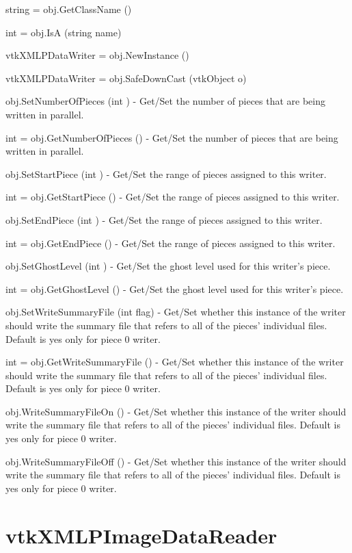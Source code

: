\begin{DoxyItemize}
\item {\ttfamily string = obj.\-Get\-Class\-Name ()}  
\item {\ttfamily int = obj.\-Is\-A (string name)}  
\item {\ttfamily vtk\-X\-M\-L\-P\-Data\-Writer = obj.\-New\-Instance ()}  
\item {\ttfamily vtk\-X\-M\-L\-P\-Data\-Writer = obj.\-Safe\-Down\-Cast (vtk\-Object o)}  
\item {\ttfamily obj.\-Set\-Number\-Of\-Pieces (int )} -\/ Get/\-Set the number of pieces that are being written in parallel.  
\item {\ttfamily int = obj.\-Get\-Number\-Of\-Pieces ()} -\/ Get/\-Set the number of pieces that are being written in parallel.  
\item {\ttfamily obj.\-Set\-Start\-Piece (int )} -\/ Get/\-Set the range of pieces assigned to this writer.  
\item {\ttfamily int = obj.\-Get\-Start\-Piece ()} -\/ Get/\-Set the range of pieces assigned to this writer.  
\item {\ttfamily obj.\-Set\-End\-Piece (int )} -\/ Get/\-Set the range of pieces assigned to this writer.  
\item {\ttfamily int = obj.\-Get\-End\-Piece ()} -\/ Get/\-Set the range of pieces assigned to this writer.  
\item {\ttfamily obj.\-Set\-Ghost\-Level (int )} -\/ Get/\-Set the ghost level used for this writer's piece.  
\item {\ttfamily int = obj.\-Get\-Ghost\-Level ()} -\/ Get/\-Set the ghost level used for this writer's piece.  
\item {\ttfamily obj.\-Set\-Write\-Summary\-File (int flag)} -\/ Get/\-Set whether this instance of the writer should write the summary file that refers to all of the pieces' individual files. Default is yes only for piece 0 writer.  
\item {\ttfamily int = obj.\-Get\-Write\-Summary\-File ()} -\/ Get/\-Set whether this instance of the writer should write the summary file that refers to all of the pieces' individual files. Default is yes only for piece 0 writer.  
\item {\ttfamily obj.\-Write\-Summary\-File\-On ()} -\/ Get/\-Set whether this instance of the writer should write the summary file that refers to all of the pieces' individual files. Default is yes only for piece 0 writer.  
\item {\ttfamily obj.\-Write\-Summary\-File\-Off ()} -\/ Get/\-Set whether this instance of the writer should write the summary file that refers to all of the pieces' individual files. Default is yes only for piece 0 writer.  
\end{DoxyItemize}\hypertarget{vtkio_vtkxmlpimagedatareader}{}\section{vtk\-X\-M\-L\-P\-Image\-Data\-Reader}\label{vtkio_vtkxmlpimagedatareader}
